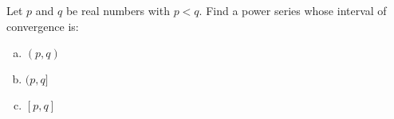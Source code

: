 \documentclass[notes]{subfiles}
\begin{document}
		\begin{ex}
			Let $p$ and $q$ be real numbers with $p < q$.  Find a power series whose interval of convergence is:
			\begin{enumerate}[(a)]
				\item $(p,q)$
					
				\item $(p,q]$
					
				\item $[p,q]$
			\end{enumerate}
		\end{ex}
	
\clearpage
\end{document}
